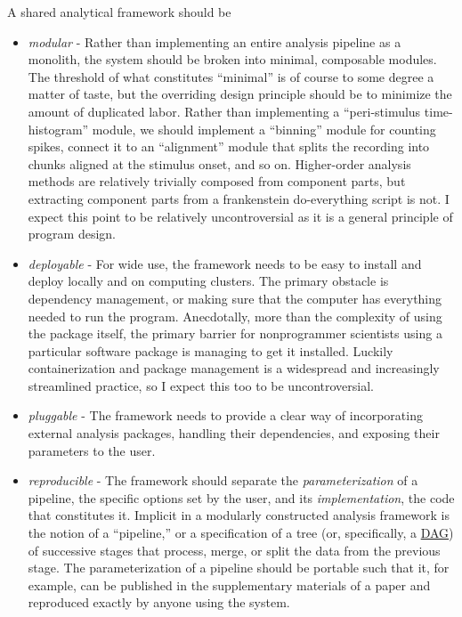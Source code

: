 \documentclass[10pt]{article}
\begin{document}
\begin{multicols}{2}
A shared analytical framework should be

\begin{itemize}

\item
  \emph{modular} - Rather than implementing an entire analysis pipeline
  as a monolith, the system should be broken into minimal, composable
  modules. The threshold of what constitutes ``minimal'' is of course to
  some degree a matter of taste, but the overriding design principle
  should be to minimize the amount of duplicated labor. Rather than
  implementing a ``peri-stimulus time-histogram'' module, we should
  implement a ``binning'' module for counting spikes, connect it to an
  ``alignment'' module that splits the recording into chunks aligned at
  the stimulus onset, and so on. Higher-order analysis methods are
  relatively trivially composed from component parts, but extracting
  component parts from a frankenstein do-everything script is not. I
  expect this point to be relatively uncontroversial as it is a general
  principle of program design.
\item
  \emph{deployable} - For wide use, the framework needs to be easy to
  install and deploy locally and on computing clusters. The primary
  obstacle is dependency management, or making sure that the computer
  has everything needed to run the program. Anecdotally, more than the
  complexity of using the package itself, the primary barrier for
  nonprogrammer scientists using a particular software package is
  managing to get it installed. Luckily containerization and package
  management is a widespread and increasingly streamlined practice, so I
  expect this too to be uncontroversial.
\item
  \emph{pluggable} - The framework needs to provide a clear way of
  incorporating external analysis packages, handling their dependencies,
  and exposing their parameters to the user.
\item
  \emph{reproducible} - The framework should separate the
  \emph{parameterization} of a pipeline, the specific options set by the
  user, and its \emph{implementation}, the code that constitutes it.
  Implicit in a modularly constructed analysis framework is the notion
  of a ``pipeline,'' or a specification of a tree (or, specifically, a
  \href{https://en.wikipedia.org/wiki/Directed_acyclic_graph}{DAG}) of
  successive stages that process, merge, or split the data from the
  previous stage. The parameterization of a pipeline should be portable
  such that it, for example, can be published in the supplementary
  materials of a paper and reproduced exactly by anyone using the
  system.
\end{itemize}


\end{multicols}
\end{document}
